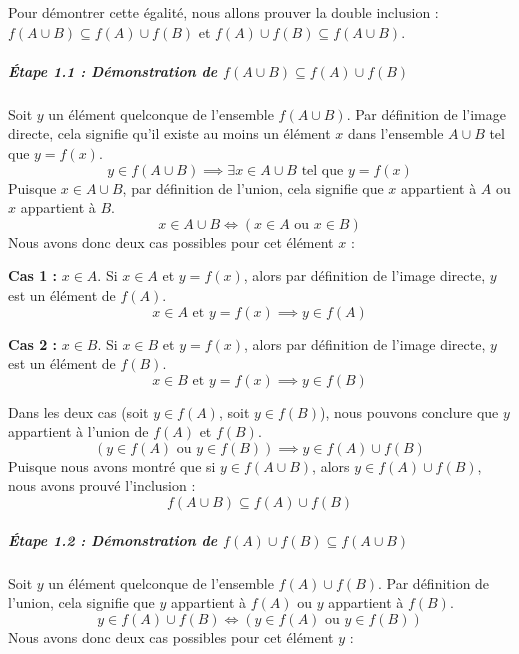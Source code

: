 \documentclass[12pt,a4paper]{report}
\begin{document}
Pour démontrer cette égalité, nous allons prouver la double inclusion :
\(f(A \cup B) \subseteq f(A) \cup f(B)\) et
\(f(A) \cup f(B) \subseteq f(A \cup B)\).

\subparagraph{\texorpdfstring{Étape 1.1 : Démonstration de
\(f(A \cup B) \subseteq f(A) \cup f(B)\)}{Étape 1.1 : Démonstration de f(A \textbackslash cup B) \textbackslash subseteq f(A) \textbackslash cup f(B)}}\label{uxe9tape-1.1-duxe9monstration-de-fa-cup-b-subseteq-fa-cup-fb}

Soit \(y\) un élément quelconque de l'ensemble \(f(A \cup B)\). Par
définition de l'image directe, cela signifie qu'il existe au moins un
élément \(x\) dans l'ensemble \(A \cup B\) tel que \(y = f(x)\).
\[y \in f(A \cup B) \implies \exists x \in A \cup B \text{ tel que } y = f(x)\]
Puisque \(x \in A \cup B\), par définition de l'union, cela signifie que
\(x\) appartient à \(A\) ou \(x\) appartient à \(B\).
\[x \in A \cup B \iff (x \in A \text{ ou } x \in B)\] Nous avons donc
deux cas possibles pour cet élément \(x\) :

\textbf{Cas 1 :} \(x \in A\). Si \(x \in A\) et \(y = f(x)\), alors par
définition de l'image directe, \(y\) est un élément de \(f(A)\).
\[x \in A \text{ et } y = f(x) \implies y \in f(A)\]

\textbf{Cas 2 :} \(x \in B\). Si \(x \in B\) et \(y = f(x)\), alors par
définition de l'image directe, \(y\) est un élément de \(f(B)\).
\[x \in B \text{ et } y = f(x) \implies y \in f(B)\]

Dans les deux cas (soit \(y \in f(A)\), soit \(y \in f(B)\)), nous
pouvons conclure que \(y\) appartient à l'union de \(f(A)\) et \(f(B)\).
\[(y \in f(A) \text{ ou } y \in f(B)) \implies y \in f(A) \cup f(B)\]
Puisque nous avons montré que si \(y \in f(A \cup B)\), alors
\(y \in f(A) \cup f(B)\), nous avons prouvé l'inclusion :
\[f(A \cup B) \subseteq f(A) \cup f(B)\]

\subparagraph{\texorpdfstring{Étape 1.2 : Démonstration de
\(f(A) \cup f(B) \subseteq f(A \cup B)\)}{Étape 1.2 : Démonstration de f(A) \textbackslash cup f(B) \textbackslash subseteq f(A \textbackslash cup B)}}\label{uxe9tape-1.2-duxe9monstration-de-fa-cup-fb-subseteq-fa-cup-b}

Soit \(y\) un élément quelconque de l'ensemble \(f(A) \cup f(B)\). Par
définition de l'union, cela signifie que \(y\) appartient à \(f(A)\) ou
\(y\) appartient à \(f(B)\).
\[y \in f(A) \cup f(B) \iff (y \in f(A) \text{ ou } y \in f(B))\] Nous
avons donc deux cas possibles pour cet élément \(y\) :
\end{document}
